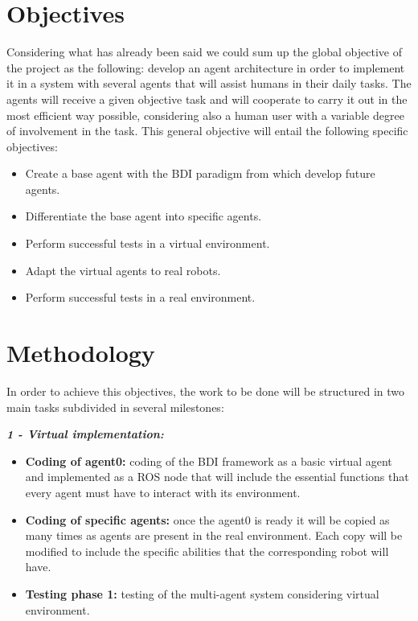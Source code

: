 \section{Objectives}
Considering what has already been said we could sum up the global objective of the project as the following: develop an agent architecture in order to implement it in a system with several agents that will assist humans in their daily tasks. The agents will receive a given objective task and will cooperate to carry it out in the most efficient way possible, considering also a human user with a variable degree of involvement in the task.
This general objective will entail the following specific objectives:\par
\begin{itemize}
\item Create a base agent with the BDI paradigm from which develop future agents.
\item Differentiate the base agent into specific agents.
\item Perform successful tests in a virtual environment.
\item Adapt the virtual agents to real robots.
\item Perform successful tests in a real environment.
\end{itemize}

\section{Methodology}
In order to achieve this objectives, the work to be done will be structured in two main tasks subdivided in several milestones:

\textit{\textbf{1 - Virtual implementation:}} 
\begin{itemize}
\item \textbf{Coding of agent0:} coding of the BDI framework as a basic virtual agent and implemented as a ROS node that will include the essential functions that every agent must have to interact with its environment.
\item \textbf{Coding of specific agents:} once the agent0 is ready it will be copied as many times as agents are present in the real environment. Each copy will be modified to include the specific abilities that the corresponding robot will have.
\item \textbf{Testing phase 1:} testing of the multi-agent system considering virtual environment.
\end{itemize}
    
